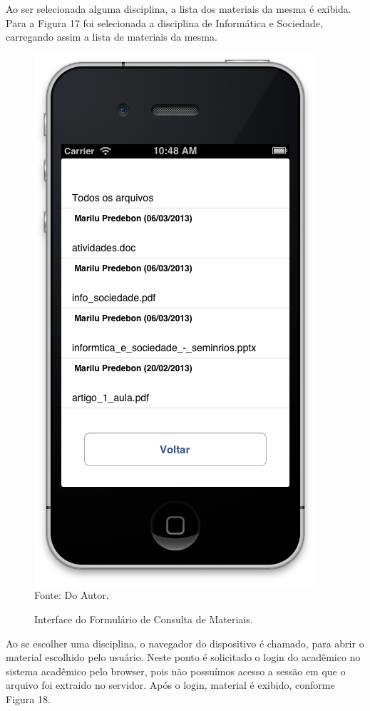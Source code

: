 Ao ser selecionada alguma disciplina, a lista dos materiais da mesma é exibida. Para a Figura 17 foi selecionada a disciplina de Informática e Sociedade, carregando assim a lista de materiais da mesma.

\begin{figure}[!htb]
     \centering
     \caption[Formulário Material de Apoio - Consulta de Materiais]{Interface do Formulário de Consulta de Materiais.}
     \includegraphics[scale=0.34]{imagens/formmaterialdisciplina.png}
     \\  Fonte: Do Autor.
\end{figure}
\newpage

Ao se escolher uma disciplina, o navegador do dispositivo é chamado, para abrir o material escolhido pelo usuário. Neste ponto é solicitado o login do acadêmico no sistema acadêmico pelo browser, pois não possuímos acesso a sessão em que o arquivo foi extraido no servidor. Após o login, material é exibido, conforme Figura 18.

